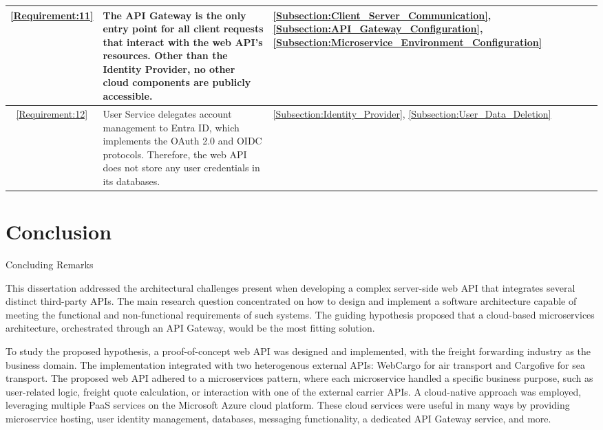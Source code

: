 \documentclass[12pt, reqno]{amsbook}
\makeatletter
\def\section{\@startsection{section}{1}%
      \z@{.5\linespacing\@plus.7\linespacing}{.25\linespacing}%
      {\normalfont\bfseries\flushleft}}
\theoremstyle{definition}
\theoremstyle{definition}
\numberwithin{section}{chapter}
\numberwithin{table}{chapter}
\numberwithin{figure}{chapter}
\makeatother
\begin{document}
\begin{longtable}{|c|m{280pt}|M{65pt}|}
  \hline
  \ref{Requirement:11}
   & The \ac{API} Gateway is the only entry point for all client requests that interact with the web \ac{API}'s resources. Other than the Identity Provider, no other cloud components are publicly accessible.
   & \ref{Subsection:Client_Server_Communication}, \ref{Subsection:API_Gateway_Configuration}, \ref{Subsection:Microservice_Environment_Configuration}                                                                                                                            \\
  \hline
  \ref{Requirement:12}
   & User Service delegates account management to Entra ID, which implements the \ac{OAuth} 2.0 and \ac{OIDC} protocols. Therefore, the web \ac{API} does not store any user credentials in its databases.
   & \ref{Subsection:Identity_Provider}, \ref{Subsection:User_Data_Deletion}                                                                                                                                                                                                      \\
\end{longtable}
\endgroup


\chapter{Conclusion}
\label{Chapter:Conclusion}

\section{Concluding Remarks}
\label{Section:Concluding_Remarks}

This dissertation addressed the architectural challenges present when developing a complex server-side web \ac{API} that integrates several distinct third-party \acp{API}. The main research question concentrated on how to design and implement a software architecture capable of meeting the functional and non-functional requirements of such systems. The guiding hypothesis proposed that a cloud-based microservices architecture, orchestrated through an API Gateway, would be the most fitting solution.

To study the proposed hypothesis, a proof-of-concept web \ac{API} was designed and implemented, with the freight forwarding industry as the business domain. The implementation integrated with two heterogenous external APIs: WebCargo for air transport and Cargofive for sea transport. The proposed web \ac{API} adhered to a microservices pattern, where each microservice handled a specific business purpose, such as user-related logic, freight quote calculation, or interaction with one of the external carrier \acp{API}. A cloud-native approach was employed, leveraging multiple \ac{PaaS} services on the Microsoft Azure cloud platform. These cloud services were useful in many ways by providing microservice hosting, user identity management, databases, messaging functionality, a dedicated \ac{API} Gateway service, and more.
\end{document}
